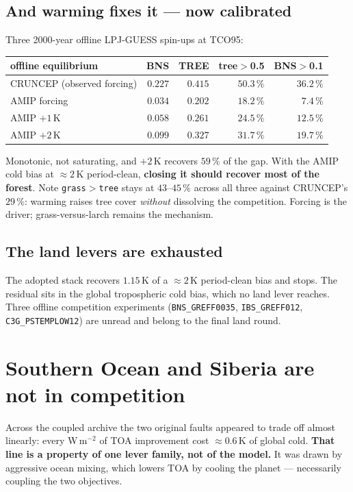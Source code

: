 \documentclass[10pt]{article}
\begin{document}
\subsection{And warming fixes it --- now calibrated}
Three 2000-year offline LPJ-GUESS spin-ups at TCO95:

\begin{center}\footnotesize
\begin{tabular}{l r r r r}
\toprule
offline equilibrium & BNS & TREE & tree$>$0.5 & BNS$>$0.1 \\
\midrule
CRUNCEP (observed forcing) & $0.227$ & $0.415$ & $50.3\,\%$ & $36.2\,\%$ \\
AMIP forcing & $0.034$ & $0.202$ & $18.2\,\%$ & $7.4\,\%$ \\
AMIP $+1$\,K & $0.058$ & $0.261$ & $24.5\,\%$ & $12.5\,\%$ \\
AMIP $+2$\,K & $\mathbf{0.099}$ & $\mathbf{0.327}$ & $31.7\,\%$ & $19.7\,\%$ \\
\bottomrule
\end{tabular}
\end{center}

\noindent Monotonic, not saturating, and $+2$\,K recovers $59\,\%$ of the gap. With the
AMIP cold bias at ${\approx}2$\,K period-clean, \textbf{closing it should recover most of
the forest}. Note \texttt{grass$>$tree} stays at $43$--$45\,\%$ across all three against
CRUNCEP's $29\,\%$: warming raises tree cover \emph{without} dissolving the competition.
Forcing is the driver; grass-versus-larch remains the mechanism.

\subsection{The land levers are exhausted}
The adopted stack recovers $1.15$\,K of a ${\approx}2$\,K period-clean bias and stops. The
residual sits in the global tropospheric cold bias, which no land lever reaches. Three
offline competition experiments (\texttt{BNS\_GREFF0035}, \texttt{IBS\_GREFF012},
\texttt{C3G\_PSTEMPLOW12}) are unread and belong to the final land round.

\section{Southern Ocean and Siberia are not in competition}\label{sec:both}

Across the coupled archive the two original faults appeared to trade off almost linearly:
every W\,m$^{-2}$ of TOA improvement cost ${\approx}0.6$\,K of global cold. \textbf{That
line is a property of one lever family, not of the model.} It was drawn by aggressive ocean
mixing, which lowers TOA by cooling the planet --- necessarily coupling the two objectives.
\end{document}
